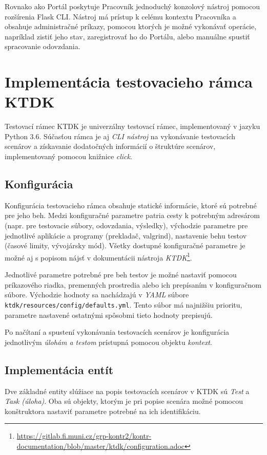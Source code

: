 \documentclass[
  digital, %
  oneside, %
  table,   %
  lof,     %
  lot,   %
]{fithesis3}
\begin{document}
Rovnako ako Portál poskytuje Pracovník jednoduchý konzolový nástroj pomocou rozšírenia Flask CLI. Nástroj má prístup k celému kontextu Pracovníka a obsahuje administračné príkazy, pomocou ktorých je možné vykonávať operácie, napríklad zistiť jeho stav, zaregistrovať ho do Portálu, alebo manuálne spustiť spracovanie odovzdania.

\section{Implementácia testovacieho rámca KTDK}

Testovací rámec KTDK je univerzálny testovací rámec, implementovaný v jazyku Python 3.6. Súčasťou rámca je aj \emph{CLI nástroj} na vykonávanie testovacích scenárov a získavanie dodatočných informácií o štruktúre scenárov, implementovaný pomocou knižnice \emph{click}.

\subsection{Konfigurácia}
Konfigurácia testovacieho rámca obsahuje statické informácie, ktoré sú potrebné pre jeho beh. Medzi konfiguračné parametre patria cesty k potrebným adresárom (napr. pre testovacie súbory, odovzdania, výsledky), východzie parametre pre jednotlivé aplikácie a programy (prekladač, valgrind), nastavenie behu testov (časové limity, vývojársky mód). Všetky dostupné konfiguračné parametre je možné aj s popisom nájsť v dokumentácii nástroja \emph{KTDK}\footnote{\url{https://gitlab.fi.muni.cz/grp-kontr2/kontr-documentation/blob/master/ktdk/configuration.adoc}}.

Jednotlivé parametre potrebné pre beh testov je možné nastaviť pomocou príkazového riadka, premenných prostredia alebo ich prepísaním v konfiguračnom súbore. Východzie hodnoty sa nachádzajú v \emph{YAML} súbore \texttt{ktdk/resources/config/defaults.yml}. Tento súbor má najnižšiu prioritu, parametre nastavené ostatnými spôsobmi tieto hodnoty prepisujú.

Po načítaní a spustení vykonávania testovacích scenárov je konfigurácia jednotlivým \emph{úlohám a testom} prístupná pomocou objektu \emph{kontext}.


\subsection{Implementácia entít}

Dve základné entity slúžiace na popis testovacích scenárov v KTDK sú \emph{Test} a \emph{Task (úloha)}. Oba sú objekty, ktorým je pri popise scenára možné pomocou konštruktora nastaviť parametre potrebné na ich identifikáciu. 
\end{document}
